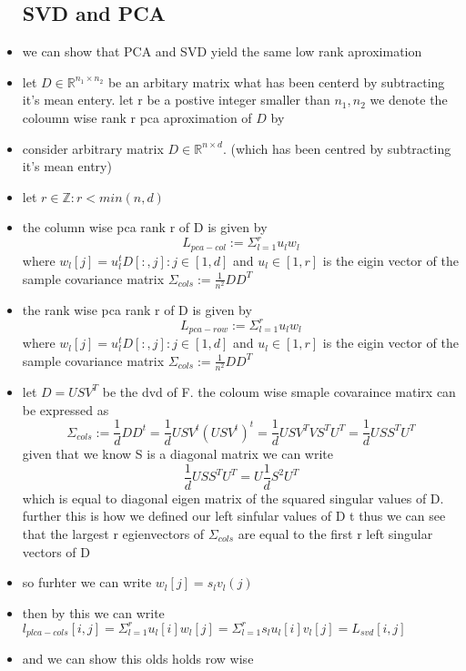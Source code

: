 \documentclass{article}
\begin{document}
\begin{itemize}
\subsection{SVD and PCA}
\item we can show that PCA and SVD yield the same low rank aproximation 
\item let $D\in \mathbb{R}^{n_1\times n_2}$ be an arbitary matrix what has been centerd by subtracting it's mean entery. let r be a postive integer smaller than $n_1, n_2$ we denote the coloumn wise rank r pca aproximation of $D$ by


































\item
consider arbitrary matrix $D\in \mathbb{R}^{n\times d}$. (which has been centred by subtracting it's mean entry)
\item let $r\in \mathbb{Z}:r<min(n,d)$
\item the column wise pca rank r of D is given by $$L_{pca-col}:=\Sigma_{l=1}^{r}u_{l}w_{l}$$ where $w_{l}[j]=u_{l}^{t}D[:,j]: j\in [1,d]$ and $u_l\in [1,r]$ is the eigin vector of the sample covariance matrix $\Sigma_{cols}:=\frac{1}{n^2}DD^T$
\item the rank wise pca rank r of D is given by $$L_{pca-row}:=\Sigma_{l=1}^{r}u_{l}w_{l}$$ where $w_{l}[j]=u_{l}^{t}D[:,j]: j\in [1,d]$ and $u_l\in [1,r]$ is the eigin vector of the sample covariance matrix $\Sigma_{cols}:=\frac{1}{n^2}DD^T$
\item let $D=USV^T$ be the dvd of F. the coloum wise smaple covaraince matirx can be expressed as 
$$\Sigma_{cols}:=\frac{1}{d}DD^t=\frac{1}{d}USV^t(USV^t)^t=\frac{1}{d}USV^T VS^TU^T=\frac{1}{d}USS^TU^T$$ given that we know S is a diagonal matrix we can write 
$$\frac{1}{d}USS^TU^T=U\frac{1}{d}S^2U^T$$ which is equal to diagonal eigen matrix of the squared singular values of D. further this is how we defined our left sinfular values of D t thus we can see that the largest r egienvectors of $\Sigma_{cols}$ are equal to the first r left singular vectors of D 
\item so furhter we can write $w_{l}[j]=s_{l}v_{l}(j)$
\item then by this we can write $l_{plca-cols}[i,j]=\Sigma_{l=1}^{r}u_{l}[i]w_{l}[j]=\Sigma_{l=1}^{r}s_{l}u_{l}[i]v_{l}[j]=L_{svd}[i,j]$
\item and we can show this olds holds row wise 

\end{itemize}
\end{document}
